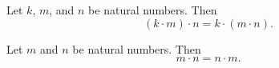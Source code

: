 \begin{proposition}[Associativity]
Let $k$, $m$, and $n$ be natural numbers. Then
\[
(k \cdot  m) \cdot  n = k \cdot  (m \cdot  n).
\]
\end{proposition}

\begin{proposition}
Let $m$ and $n$ be natural numbers. Then
\[
m \cdot  n = n \cdot  m.
\]
\end{proposition}


\blankpage